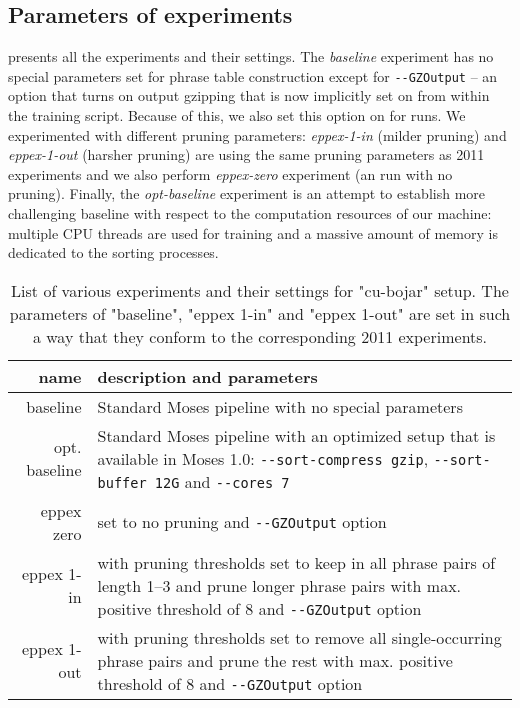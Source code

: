 \subsection{Parameters of experiments}

 presents all the experiments and their settings.
The \emph{baseline} experiment has no special parameters set for phrase table
construction except for \verb|--GZOutput| -- an option that turns on output
gzipping that is now implicitly set on from within the training script.
Because of this, we also set this option on for \eppex{} runs.
We experimented with different pruning parameters: \emph{eppex-1-in} (milder
pruning) and \emph{eppex-1-out} (harsher pruning) are using the same pruning
parameters as 2011 experiments and we also perform \emph{eppex-zero} experiment
(an \eppex{} run with no pruning).
Finally, the \emph{opt-baseline} experiment is an attempt to establish more
challenging baseline with respect to the computation resources of our machine:
multiple CPU threads are used for training and a massive amount of memory is
dedicated to the sorting processes.

\begin{table}[ht]
\centering
\begin{tabular}{ r p{10cm} }
name & description and parameters \\
\hline
\hline
baseline        & Standard Moses pipeline with no special parameters \\
opt. baseline   & Standard Moses pipeline with an optimized setup that is
available in Moses 1.0:
\verb|--sort-compress gzip|, \verb|--sort-buffer 12G| and \verb|--cores 7| \\
eppex zero      & \eppex{} set to no pruning and \verb|--GZOutput| option \\
eppex 1-in      & \eppex{} with pruning thresholds set to keep in
all phrase pairs of length 1--3 and prune longer phrase pairs
with max. positive threshold of 8 and \verb|--GZOutput| option \\
eppex 1-out     & \eppex{} with pruning thresholds set to remove
all single-occurring phrase pairs and prune the rest with
max. positive threshold of 8 and \verb|--GZOutput| option \\
\hline
\hline
\end{tabular}
\caption{\label{cu-bojar-scenarios}List of various experiments and their
settings for "cu-bojar" setup. The parameters of "baseline", "eppex 1-in"
and "eppex 1-out" are set in such a way that they conform to the
corresponding 2011 experiments.}
\end{table}

